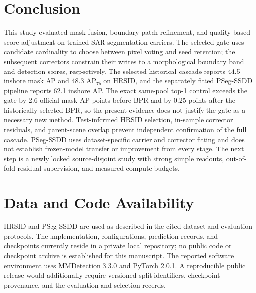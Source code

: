 \section{Conclusion}\label{sec:conclusion}
This study evaluated mask fusion, boundary-patch refinement, and quality-based score adjustment on trained SAR segmentation carriers. The selected gate uses candidate cardinality to choose between pixel voting and seed retention; the subsequent correctors constrain their writes to a morphological boundary band and detection scores, respectively. The selected historical cascade reports 44.5 inshore mask AP and 48.3 AP$_{75}$ on HRSID, and the separately fitted PSeg-SSDD pipeline reports 62.1 inshore AP. The exact same-pool top-1 control exceeds the gate by 2.6 official mask AP points before BPR and by 0.25 points after the historically selected BPR, so the present evidence does not justify the gate as a necessary new method. Test-informed HRSID selection, in-sample corrector residuals, and parent-scene overlap prevent independent confirmation of the full cascade. PSeg-SSDD uses dataset-specific carrier and corrector fitting and does not establish frozen-model transfer or improvement from every stage. The next step is a newly locked source-disjoint study with strong simple readouts, out-of-fold residual supervision, and measured compute budgets.

\section*{Data and Code Availability}
HRSID and PSeg-SSDD are used as described in the cited dataset and evaluation protocols. The implementation, configurations, prediction records, and checkpoints currently reside in a private local repository; no public code or checkpoint archive is established for this manuscript. The reported software environment uses MMDetection 3.3.0 and PyTorch 2.0.1. A reproducible public release would additionally require versioned split identifiers, checkpoint provenance, and the evaluation and selection records.
